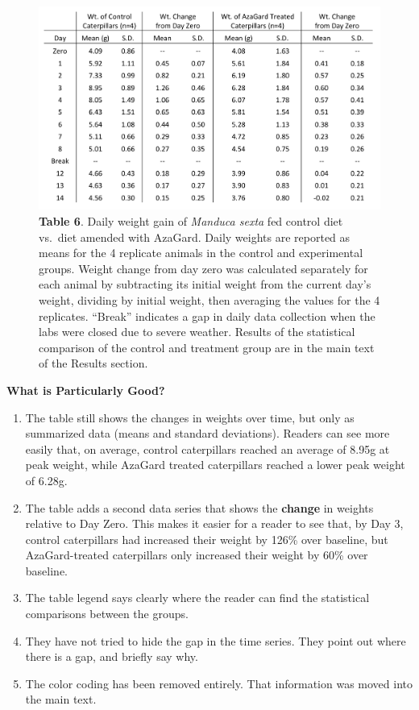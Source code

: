 \documentclass[
]{book}
\providecommand{\tightlist}{%
  \setlength{\itemsep}{0pt}\setlength{\parskip}{0pt}}
\begin{document}
\begin{figure}
\centering
\includegraphics{images/Good_table3.png}
\caption{\textbf{Table 6}. Daily weight gain of \emph{Manduca sexta} fed control diet vs.~diet amended with AzaGard. Daily weights are reported as means for the 4 replicate animals in the control and experimental groups. Weight change from day zero was calculated separately for each animal by subtracting its initial weight from the current day's weight, dividing by initial weight, then averaging the values for the 4 replicates. ``Break'' indicates a gap in daily data collection when the labs were closed due to severe weather. Results of the statistical comparison of the control and treatment group are in the main text of the Results section.}
\end{figure}

\textbf{What is Particularly Good?}

\begin{enumerate}
\def\labelenumi{\arabic{enumi}.}
\tightlist
\item
  The table still shows the changes in weights over time, but only as summarized data (means and standard deviations). Readers can see more easily that, on average, control caterpillars reached an average of 8.95g at peak weight, while AzaGard treated caterpillars reached a lower peak weight of 6.28g.
\item
  The table adds a second data series that shows the \textbf{change} in weights relative to Day Zero. This makes it easier for a reader to see that, by Day 3, control caterpillars had increased their weight by 126\% over baseline, but AzaGard-treated caterpillars only increased their weight by 60\% over baseline.
\item
  The table legend says clearly where the reader can find the statistical comparisons between the groups.
\item
  They have not tried to hide the gap in the time series. They point out where there is a gap, and briefly say why.
\item
  The color coding has been removed entirely. That information was moved into the main text.
\end{enumerate}
\end{document}
